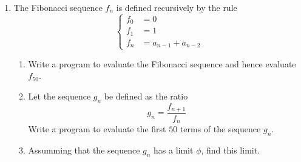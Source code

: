 \documentclass[11pt,a4paper,titlepage,oneside,openany]{article}
\numberwithin{equation}{section}
\numberwithin{algorithm}{section}
\numberwithin{figure}{section}
\numberwithin{table}{section}
\begin{document}
\begin{enumerate}
\pagebreak

\item The Fibonacci sequence $f_n$ is defined recursively by the rule
  \begin{equation*}
    \begin{cases}
      f_0&=0\\
      f_1&=1\\
      f_n&=a_{n-1}+a_{n-2}
    \end{cases}
  \end{equation*}

  \begin{enumerate}
  \item
    Write a program to evaluate the Fibonacci sequence and hence evaluate $f_{50}$.
  \item
    Let the sequence $g_n$ be defined as the ratio
    \begin{equation*}
      g_n = \frac{f_{n+1}}{f_n}
    \end{equation*}
    Write a program to evaluate the first $50$ terms of the sequence $g_n$.
  \item
    Assumming that the sequence $g_n$ has a limit $\phi$, find this limit. 
  \end{enumerate}

  




\end{enumerate}
\end{document}
